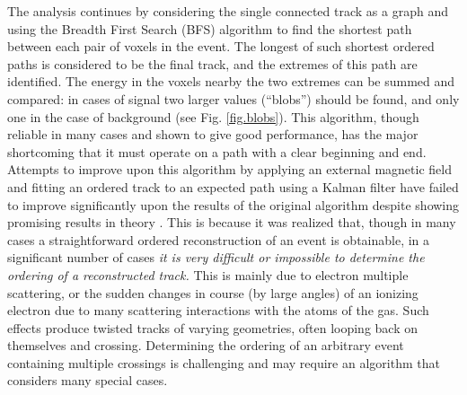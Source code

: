 \documentclass[11pt,a4paper]{article}
\begin{document}
The analysis continues by considering the single connected track as a graph and using the Breadth First Search (BFS) algorithm to find the shortest path between each pair of voxels in the event. The longest of such shortest ordered paths is considered to be the final track, and the extremes of this path are identified. The energy in the voxels nearby the two extremes can be summed and compared: in cases of signal two larger values (``blobs'') should be found, and only one in the case of background (see Fig. \ref{fig.blobs}).  This algorithm, though reliable in many cases and shown to give good performance, has the major shortcoming that it must operate on a path with a clear beginning and end. Attempts to improve upon this algorithm by applying an external magnetic field and fitting an ordered track to an expected path using a Kalman filter have failed to improve significantly upon the results of the original algorithm despite showing promising results in theory \cite{NEXT_BFIELD}. This is because it was realized that, though in many cases a straightforward ordered reconstruction of an event is obtainable, in a significant number of cases \emph{it is very difficult or impossible to determine the ordering of a reconstructed track.}  This is mainly due to electron multiple scattering, or the sudden changes in course (by large angles) of an ionizing electron due to many scattering interactions with the atoms of the gas.  Such effects produce twisted tracks of varying geometries, often looping back on themselves and crossing. Determining the ordering of an arbitrary event containing multiple crossings is challenging and may require an algorithm that considers many special cases.
\end{document}
